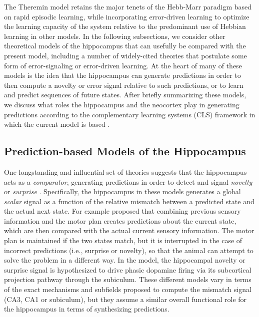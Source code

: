 \documentclass[11pt,twoside]{article}
\newif\myifpdf
\begin{document}
The Theremin model retains the major tenets of the Hebb-Marr paradigm based on rapid episodic learning, while incorporating error-driven learning to optimize the learning capacity of the system relative to the predominant use of Hebbian learning in other models.  In the following subsections, we consider other theoretical models of the hippocampus that can usefully be compared with the present model, including a number of widely-cited theories that postulate some form of error-signaling or error-driven learning.  At the heart of many of these models is the idea that the hippocampus can generate predictions in order to then compute a novelty or error signal relative to such predictions, or to learn and predict sequences of future states. After briefly summarizing these models, we discuss what roles the hippocampus and the neocortex play in generating predictions according to the complementary learning systems (CLS) framework in which the current model is based \citep{McClellandMcNaughtonOReilly95,OReillyBhattacharyyaHowardEtAl14,OReillyRanganathRussin21}.  

\subsection{Prediction-based Models of the Hippocampus}

One longstanding and influential set of theories suggests that the hippocampus acts as a \emph{comparator}, generating predictions in order to detect and signal \emph{novelty} or \emph{surprise} \citep{Gray82,Vinogradova01,LismanGrace05}.  Specifically, the hippocampus in these models generates a global \emph{scalar} signal as a function of the relative mismatch between a predicted state and the actual next state.  For example \citet{Gray82} proposed that combining previous sensory information and the motor plan creates predictions about the current state, which are then compared with the actual current sensory information.  The motor plan is maintained if the two states match, but it is interrupted in the case of incorrect predictions (i.e., surprise or novelty), so that the animal can attempt to solve the problem in a different way.  In the \citet{LismanGrace05} model, the hippocampal novelty or surprise signal is hypothesized to drive phasic dopamine firing via its subcortical projection pathway through the subiculum. These different models vary in terms of the exact mechanisms and subfields proposed to compute the mismatch signal (CA3, CA1 or subiculum), but they assume a similar overall functional role for the hippocampus in terms of synthesizing predictions. 
\end{document}
